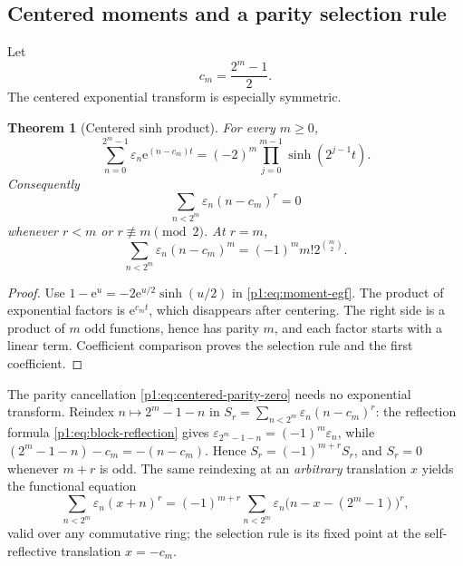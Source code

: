 \documentclass[11pt,oneside]{article}
\numberwithin{equation}{section}
\newtheorem{theorem}{Theorem}[section]
\theoremstyle{definition}
\theoremstyle{remark}
\newcommand{\e}{\mathrm e}
\newcommand{\eps}{\varepsilon}
\begin{document}
\subsection{Centered moments and a parity selection rule}
\label{p1:sec:centered-moments}

Let
\begin{equation}
  c_m=\frac{2^m-1}{2}.
  \label{p1:eq:block-center}
\end{equation}
The centered exponential transform is especially symmetric.

\begin{theorem}[Centered sinh product]
\label{p1:thm:centered-sinh}
For every \(m\ge0\),
\begin{equation}
  \boxed{
  \sum_{n=0}^{2^m-1}\eps_n\e^{(n-c_m)t}
  =(-2)^m\prod_{j=0}^{m-1}\sinh(2^{j-1}t).}
  \label{p1:eq:centered-sinh}
\end{equation}
Consequently
\begin{equation}
  \boxed{
  \sum_{n<2^m}\eps_n(n-c_m)^r=0}
  \label{p1:eq:centered-parity-zero}
\end{equation}
whenever \(r<m\) or \(r\not\equiv m\pmod2\).  At \(r=m\),
\begin{equation}
  \sum_{n<2^m}\eps_n(n-c_m)^m
  =(-1)^mm!2^{\binom m2}.
  \label{p1:eq:centered-first}
\end{equation}
\end{theorem}

\begin{proof}
Use
\(1-\e^u=-2\e^{u/2}\sinh(u/2)\) in
\eqref{p1:eq:moment-egf}.  The product of exponential factors is
\(\e^{c_mt}\), which disappears after centering.  The right side is a product
of \(m\) odd functions, hence has parity \(m\), and each factor starts with a
linear term.  Coefficient comparison proves the selection rule and the first
coefficient.
\end{proof}

\begin{remark}
\label{p1:rem:reflection-parity}
The parity cancellation \eqref{p1:eq:centered-parity-zero} needs no
exponential transform.  Reindex \(n\mapsto2^m-1-n\) in
\(S_r=\sum_{n<2^m}\eps_n(n-c_m)^r\): the reflection formula
\eqref{p1:eq:block-reflection} gives \(\eps_{2^m-1-n}=(-1)^m\eps_n\),
while \((2^m-1-n)-c_m=-(n-c_m)\).  Hence \(S_r=(-1)^{m+r}S_r\), and
\(S_r=0\) whenever \(m+r\) is odd.  The same reindexing at an
\emph{arbitrary} translation \(x\) yields the functional equation
\[
 \sum_{n<2^m}\eps_n(x+n)^r
 =(-1)^{m+r}\sum_{n<2^m}\eps_n\bigl(n-x-(2^m-1)\bigr)^r,
\]
valid over any commutative ring; the selection rule is its fixed point at
the self-reflective translation \(x=-c_m\).
\end{remark}
\end{document}

